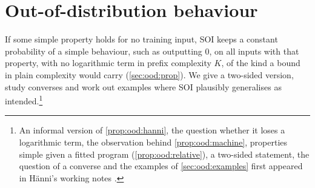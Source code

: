 \section{Out-of-distribution behaviour}\label{sec:ood}

If some simple property holds for no training input, SOI keeps a constant probability of a simple behaviour, such as outputting $0$, on all inputs with that property, with no logarithmic term in prefix complexity $K$, of the kind a bound in plain complexity would carry (\cref{sec:ood:prop}). We give a two-sided version, study converses and work out examples where SOI plausibly generalises as intended.\footnote{An informal version of \cref{prop:ood:hanni}, the question whether it loses a logarithmic term, the observation behind \cref{prop:ood:machine}, properties simple given a fitted program (\cref{prop:ood:relative}), a two-sided statement, the question of a converse and the examples of \cref{sec:ood:examples} first appeared in H\"anni's working notes \citep{hanni2026notes}.}

